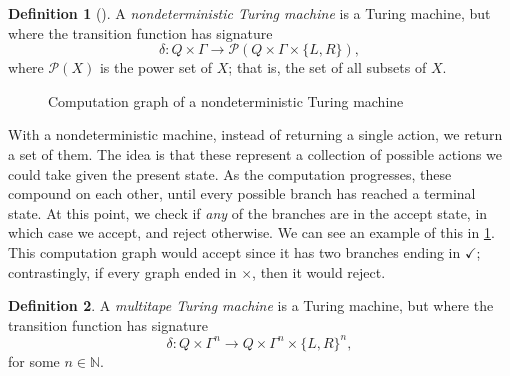 \documentclass[english,12pt]{reedthesis}
\theoremstyle{plain}
\theoremstyle{definition}
\newtheorem{defn}[defn]{Definition}
\theoremstyle{remark}
\begin{document}
\begin{defn}[{\cite[178]{Sip97}}]%
  \label{def:nondeterministic-tm}
  A \emph{nondeterministic Turing machine} is a Turing machine, but where the
  transition function has signature
  \begin{equation*}
    \delta\colon Q \times \Gamma \rightarrow \mathcal{P}(Q \times \Gamma \times \{L, R\}),
  \end{equation*}
  where $\mathcal{P}(X)$ is the power set of $X$; that is, the set of all subsets of $X$.
\end{defn}

\begin{figure}[htbp]
  \centering
  \caption{Computation graph of a nondeterministic Turing machine}\label{fig:ntm}
\end{figure}

With a nondeterministic machine, instead of returning a single action, we return
a set of them. The idea is that these represent a collection of possible actions
we could take given the present state. As the computation progresses, these
compound on each other, until every possible branch has reached a terminal
state. At this point, we check if \emph{any} of the branches are in the accept
state, in which case we accept, and reject otherwise. We can see an example of
this in \cref{fig:ntm}. This computation graph would accept since it has two
branches ending in $\checkmark$; contrastingly, if every graph ended in $\times$, then it
would reject.

\begin{defn}\label{def:multitape-tm}
  A \emph{multitape Turing machine} is a Turing machine, but where the
  transition function has signature
  \begin{equation*}
    \delta\colon Q \times \Gamma^{n} \rightarrow Q \times \Gamma^{n} \times \{L, R\}^{n},
  \end{equation*}
  for some $n \in \mathbb{N}$.
\end{defn}
\end{document}
